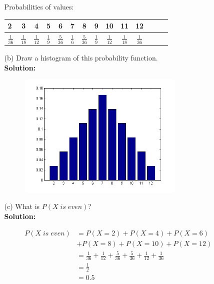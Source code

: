 \documentclass[a4paper]{article}
\begin{document}
\begin{enumerate}
\begin{enumerate}
\vspace{1em}
Probabilities of values:\\

\begin{tabular}{l*{12}{c}r}
                   2 & 3 & 4 & 5 & 6 & 7 & 8 & 9 & 10 & 11 & 12\\
\hline
                  $\frac{1}{36}$ & $\frac{1}{18}$ & $\frac{1}{12}$ & $\frac{1}{9}$ & $\frac{5}{36}$ & $\frac{1}{6}$ & $\frac{5}{36}$ & $\frac{1}{9}$ &  $\frac{1}{12}$ & $\frac{1}{18}$ & $\frac{1}{36}$  \\
\end{tabular}
\vspace{1em}


\newpage
	
	\item[(b)] Draw a histogram of this probability function.\\
	\textbf{Solution:}\\
	
	\begin{figure}[ht]
	\centering
  \includegraphics[width=0.8\textwidth]{pdf.png}
\end{figure}	
	
	\item[(c)] What is $P(X\; is\; even)$?\\
	\textbf{Solution:}
	
\begin{align*}
P(X\; is\; even) &= P(X = 2)+P(X = 4)+P(X = 6)\\& +P(X = 8)+P(X = 10)+P(X = 12)\\
&= 	\frac{1}{36} + \frac{1}{12} + \frac{5}{36} + \frac{5}{36} + \frac{1}{12} + \frac{1}{36}\\
&= \frac{1}{2}\\
&= 0.5
\end{align*}	
	

\end{enumerate}
\end{enumerate}
\end{document}
